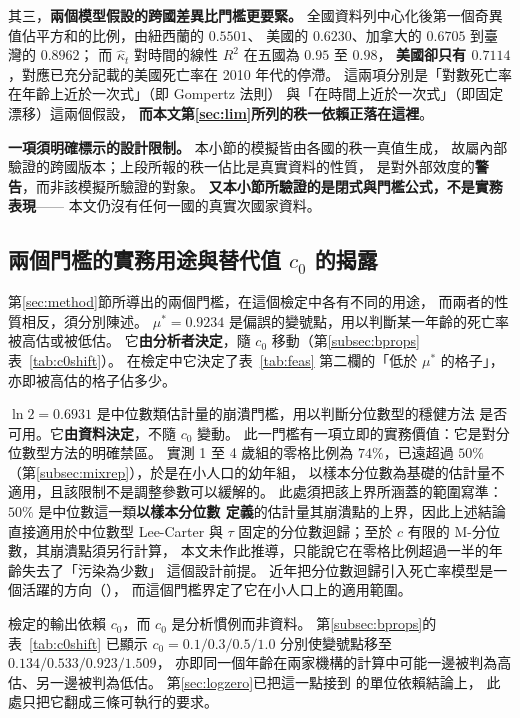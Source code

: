 \documentclass[UTF8, fontset=macnew, a4paper, 12pt]{ctexart}
\begin{document}
其三，\textbf{兩個模型假設的跨國差異比門檻更要緊。}
全國資料列中心化後第一個奇異值佔平方和的比例，由紐西蘭的 $0.5501$、
美國的 $0.6230$、加拿大的 $0.6705$ 到臺灣的 $0.8962$；
而 $\hat\kappa_t$ 對時間的線性 $R^2$ 在五國為 $0.95$ 至 $0.98$，
\textbf{美國卻只有 $0.7114$}，對應已充分記載的美國死亡率在 2010 年代的停滯。
這兩項分別是「對數死亡率在年齡上近於一次式」（即 Gompertz 法則）
與「在時間上近於一次式」（即固定漂移）這兩個假設，
\textbf{而本文第\ref{sec:lim}所列的秩一依賴正落在這裡}。

\textbf{一項須明確標示的設計限制。} 本小節的模擬皆由各國的秩一真值生成，
故屬內部驗證的跨國版本；上段所報的秩一佔比是真實資料的性質，
是對外部效度的\textbf{警告}，而非該模擬所驗證的對象。
\textbf{又本小節所驗證的是閉式與門檻公式，不是實務表現}——
本文仍沒有任何一國的真實次國家資料。

\subsection{兩個門檻的實務用途與替代值 $c_0$ 的揭露}\label{subsec:thresholds}\label{subsec:c0disc}

第\ref{sec:method}節所導出的兩個門檻，在這個檢定中各有不同的用途，
而兩者的性質相反，須分別陳述。
$\mu^{\ast}=0.9234$ 是偏誤的變號點，用以判斷某一年齡的死亡率被高估或被低估。
它\textbf{由分析者決定}，隨 $c_0$ 移動（第\ref{subsec:bprops}表~\ref{tab:c0shift}）。
在檢定中它決定了表~\ref{tab:feas} 第二欄的「低於 $\mu^{\ast}$ 的格子」，
亦即被高估的格子佔多少。

$\ln2=0.6931$ 是中位數類估計量的崩潰門檻，用以判斷分位數型的穩健方法
是否可用。它\textbf{由資料決定}，不隨 $c_0$ 變動。
此一門檻有一項立即的實務價值：它是對分位數型方法的明確禁區。
實測 1 至 4 歲組的零格比例為 $74\%$，已遠超過 $50\%$
（第\ref{subsec:mixrep}），於是在小人口的幼年組，
以樣本分位數為基礎的估計量不適用，且該限制不是調整參數可以緩解的。
此處須把該上界所涵蓋的範圍寫準：$50\%$ 是中位數這一類\textbf{以樣本分位數
定義}的估計量其崩潰點的上界，因此上述結論直接適用於中位數型 Lee-Carter 與
$\tau$ 固定的分位數迴歸；至於 $c$ 有限的 M-分位數，其崩潰點須另行計算，
本文未作此推導，只能說它在零格比例超過一半的年齡失去了「污染為少數」
這個設計前提。
近年把分位數迴歸引入死亡率模型是一個活躍的方向（\citealp{santolino2020}），
而這個門檻界定了它在小人口上的適用範圍。


檢定的輸出依賴 $c_0$，而 $c_0$ 是分析慣例而非資料。
第\ref{subsec:bprops}的表~\ref{tab:c0shift} 已顯示
$c_0=0.1/0.3/0.5/1.0$ 分別使變號點移至 $0.134/0.533/0.923/1.509$，
亦即同一個年齡在兩家機構的計算中可能一邊被判為高估、另一邊被判為低估。
第\ref{sec:logzero}已把這一點接到 \citet{chenroth2024} 的單位依賴結論上，
此處只把它翻成三條可執行的要求。
\end{document}
